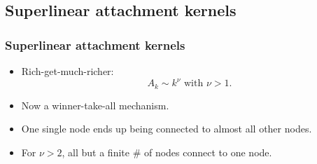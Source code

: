 \subsection{Superlinear attachment kernels}

\begin{frame}
  \frametitle{Superlinear attachment kernels}

  \begin{itemize}
  \item<1->
    Rich-get-much-richer:
    $$
    A_k \sim k^\nu
    \mbox{\ with $\nu > 1$.}
    $$
  \item<2->
    Now a \alert{winner-take-all} mechanism.
  \item<3->
    One single node ends up being connected to
    almost all other nodes.
  \item<4->
    For $\nu>2$, all but a finite \# of nodes connect
    to one node.
  \end{itemize}
  
\end{frame}




